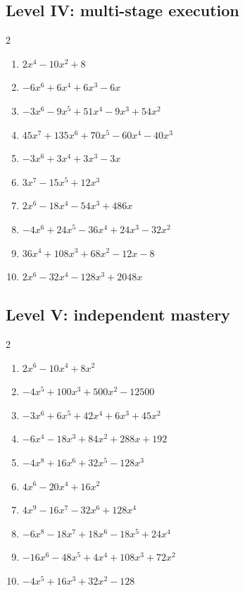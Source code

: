 \documentclass[11pt,oneside]{book}
\begin{document}
\subsection*{Level IV: multi-stage execution}
\begin{multicols}{2}
\begin{enumerate}[leftmargin=*,label=\textbf{\arabic*.},itemsep=0.65\baselineskip]
\item $ 2 x^{4} - 10 x^{2} + 8 $
\item $ - 6 x^{6} + 6 x^{4} + 6 x^{3} - 6 x $
\item $ - 3 x^{6} - 9 x^{5} + 51 x^{4} - 9 x^{3} + 54 x^{2} $
\item $ 45 x^{7} + 135 x^{6} + 70 x^{5} - 60 x^{4} - 40 x^{3} $
\item $ - 3 x^{6} + 3 x^{4} + 3 x^{3} - 3 x $
\item $ 3 x^{7} - 15 x^{5} + 12 x^{3} $
\item $ 2 x^{6} - 18 x^{4} - 54 x^{3} + 486 x $
\item $ - 4 x^{6} + 24 x^{5} - 36 x^{4} + 24 x^{3} - 32 x^{2} $
\item $ 36 x^{4} + 108 x^{3} + 68 x^{2} - 12 x - 8 $
\item $ 2 x^{6} - 32 x^{4} - 128 x^{3} + 2048 x $
\end{enumerate}
\end{multicols}
\subsection*{Level V: independent mastery}
\begin{multicols}{2}
\begin{enumerate}[leftmargin=*,label=\textbf{\arabic*.},itemsep=0.65\baselineskip]
\item $ 2 x^{6} - 10 x^{4} + 8 x^{2} $
\item $ - 4 x^{5} + 100 x^{3} + 500 x^{2} - 12500 $
\item $ - 3 x^{6} + 6 x^{5} + 42 x^{4} + 6 x^{3} + 45 x^{2} $
\item $ - 6 x^{4} - 18 x^{3} + 84 x^{2} + 288 x + 192 $
\item $ - 4 x^{8} + 16 x^{6} + 32 x^{5} - 128 x^{3} $
\item $ 4 x^{6} - 20 x^{4} + 16 x^{2} $
\item $ 4 x^{9} - 16 x^{7} - 32 x^{6} + 128 x^{4} $
\item $ - 6 x^{8} - 18 x^{7} + 18 x^{6} - 18 x^{5} + 24 x^{4} $
\item $ - 16 x^{6} - 48 x^{5} + 4 x^{4} + 108 x^{3} + 72 x^{2} $
\item $ - 4 x^{5} + 16 x^{3} + 32 x^{2} - 128 $
\end{enumerate}
\end{multicols}
\end{document}
